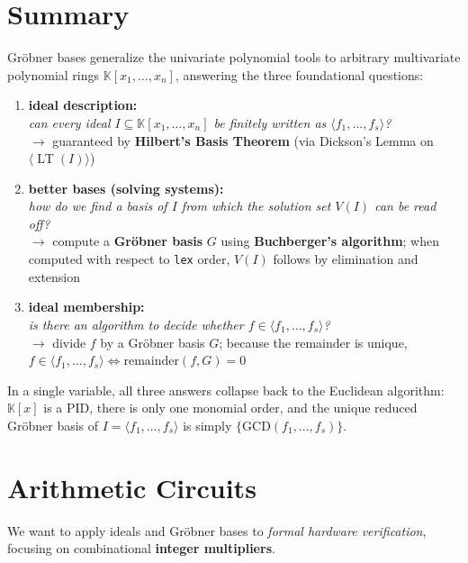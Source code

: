 \documentclass[a4paper, 11pt]{report}
\newcommand{\LT}{\operatorname{LT}}
\begin{document}
\section{Summary}
Gröbner bases generalize the univariate polynomial tools to arbitrary multivariate polynomial rings $\mathbb{K}[x_1, \dots, x_n]$, answering the three foundational questions:

\begin{enumerate}
    \item \textbf{ideal description:}\\
        \emph{can every ideal $I \subseteq \mathbb{K}[x_1, \dots, x_n]$ be finitely written as $\langle f_1, \dots, f_s \rangle$?} \\
    $\rightarrow$ guaranteed by \textbf{Hilbert's Basis Theorem} (via Dickson's Lemma on $\langle \LT(I) \rangle$)
    
    \item \textbf{better bases (solving systems):} \\
        \emph{how do we find a basis of $I$ from which the solution set $V(I)$ can be read off?} \\
    $\rightarrow$ compute a \textbf{Gröbner basis} $G$ using \textbf{Buchberger's algorithm}; when computed with respect to \texttt{lex} order, $V(I)$ follows by elimination and extension
    
    \item \textbf{ideal membership:}\\ 
        \emph{is there an algorithm to decide whether $f \in \langle f_1, \dots, f_s \rangle$?} \\
    $\rightarrow$ divide $f$ by a Gröbner basis $G$; because the remainder is unique, $f \in \langle f_1, \dots, f_s \rangle \iff \text{remainder}(f, G) = 0$
\end{enumerate}

In a single variable, all three answers collapse back to the Euclidean algorithm: $\mathbb{K}[x]$ is a PID, there is only one monomial order, and the unique reduced Gröbner basis of $I = \langle f_1, \dots, f_s \rangle$ is simply $\{\text{GCD}(f_1, \dots, f_s)\}$.

\section{Arithmetic Circuits}
We want to apply ideals and Gr\"obner bases to \emph{formal hardware verification}, focusing on combinational \textbf{integer multipliers}.
\end{document}
